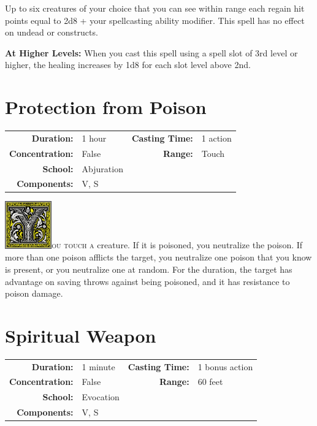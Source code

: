 \documentclass[12pt,showtrims]{memoir}
\begin{document}
\vspace{1\baselineskip}\noindent Up to six creatures of your choice that you can see within range each regain hit points equal to 2d8 + your spellcasting ability modifier. This spell has no effect on undead or constructs.

\vspace{8pt} \noindent\textbf{At Higher Levels:} When you cast this spell using a spell slot of 3rd level or higher, the healing increases by 1d8 for each slot level above 2nd.
\newpage
\section*{Protection from Poison}

{
\small\centering\vspace{-6pt}
\begin{tabular}{rlrl}
\toprule

\textbf{Duration:} & 1 hour &
\textbf{Casting Time:} & 1 action \\
\textbf{Concentration:} & False &
\textbf{Range:} & Touch \\
\textbf{School:} & Abjuration \\
\textbf{Components:} & \multicolumn{3}{p{0.7\textwidth}}{V, S}\\

\bottomrule
\end{tabular}
}

\vspace{1\baselineskip}\noindent 
\lettrine[lines=4]{\includegraphics[height=58pt]{initials/Y.png}}{ou touch a} creature. If it is poisoned, you neutralize the poison. If more than one poison afflicts the target, you neutralize one poison that you know is present, or you neutralize one at random. For the duration, the target has advantage on saving throws against being poisoned, and it has resistance to poison damage.

\newpage
\section*{Spiritual Weapon}

{
\small\centering\vspace{-6pt}
\begin{tabular}{rlrl}
\toprule

\textbf{Duration:} & 1 minute &
\textbf{Casting Time:} & 1 bonus action \\
\textbf{Concentration:} & False &
\textbf{Range:} & 60 feet \\
\textbf{School:} & Evocation \\
\textbf{Components:} & \multicolumn{3}{p{0.7\textwidth}}{V, S}\\

\bottomrule
\end{tabular}
}
\end{document}
